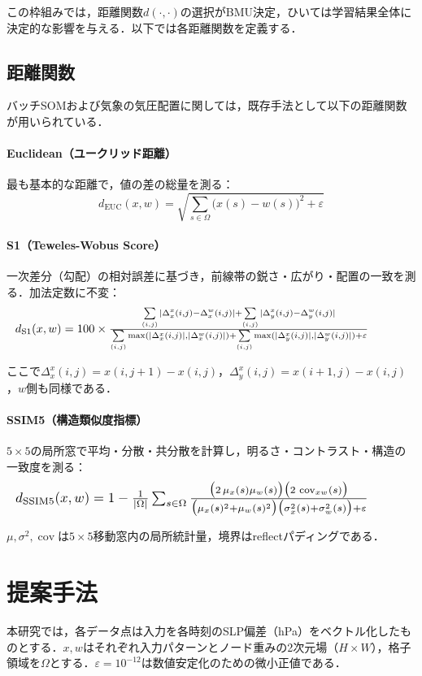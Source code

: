 \documentclass{jarticle}
\theoremstyle{definition}
\newcommand{\halfeq}[2][0.90\linewidth]{%
  \begin{equation}
    \makebox[\linewidth][l]{\resizebox{#1}{!}{\ensuremath{#2}}}%
  \end{equation}
}
\begin{document}
この枠組みでは，距離関数$d(\cdot, \cdot)$の選択がBMU決定，ひいては学習結果全体に決定的な影響を与える．以下では各距離関数を定義する．

\subsection{距離関数}
バッチSOMおよび気象の気圧配置に関しては，既存手法として以下の距離関数が用いられている．

\paragraph{Euclidean（ユークリッド距離）}
最も基本的な距離で，値の差の総量を測る：
\begin{equation}
d_{\mathrm{EUC}}(x,w)=\sqrt{\sum_{s\in\Omega}\bigl(x(s)-w(s)\bigr)^2+\varepsilon}
\end{equation}

\paragraph{S1（Teweles-Wobus Score）}
一次差分（勾配）の相対誤差に基づき，前線帯の鋭さ・広がり・配置の一致を測る．加法定数に不変：
\halfeq{%
d_{\mathrm{S1}}(x,w)=100\times
\frac{\sum\limits_{(i,j)}|\Delta_x^x(i,j)-\Delta_x^w(i,j)|+\sum\limits_{(i,j)}|\Delta_y^x(i,j)-\Delta_y^w(i,j)|}
{\sum\limits_{(i,j)}\max(|\Delta_x^x(i,j)|,|\Delta_x^w(i,j)|)+\sum\limits_{(i,j)}\max(|\Delta_y^x(i,j)|,|\Delta_y^w(i,j)|)+\varepsilon}%
}
ここで$\Delta_x^x(i,j)=x(i,j+1)-x(i,j)$，$\Delta_y^x(i,j)=x(i+1,j)-x(i,j)$，$w$側も同様である．

\paragraph{SSIM5（構造類似度指標）}
$5\times 5$の局所窓で平均・分散・共分散を計算し，明るさ・コントラスト・構造の一致度を測る：
\halfeq{%
d_{\mathrm{SSIM5}}(x,w)=1-\frac{1}{|\Omega|}\sum_{s\in\Omega}
\frac{\bigl(2\,\mu_x(s)\mu_w(s)\bigr)\bigl(2\,\operatorname{cov}_{xw}(s)\bigr)}
{\bigl(\mu_x(s)^2+\mu_w(s)^2\bigr)\bigl(\sigma_x^2(s)+\sigma_w^2(s)\bigr)+\varepsilon}%
}
$\mu,\sigma^2,\operatorname{cov}$は$5\times 5$移動窓内の局所統計量，境界はreflectパディングである．

\section{提案手法}
本研究では，各データ点は入力を各時刻のSLP偏差（hPa）をベクトル化したものとする．$x,w$はそれぞれ入力パターンとノード重みの2次元場（$H\times W$），格子領域を$\Omega$とする．$\varepsilon=10^{-12}$は数値安定化のための微小正値である．
\end{document}
